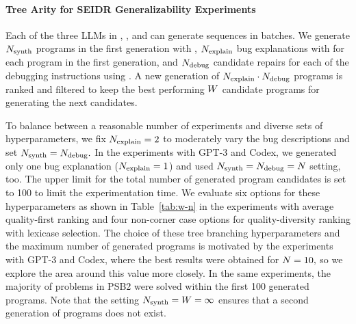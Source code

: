 
\paragraph{Tree Arity for SEIDR Generalizability Experiments}
\label{sec:seidr-tree-arity-ollama}
Each of the three LLMs in \synthesize{}, \instruct{}, and \debug{}  can generate sequences in batches. 
We generate $N_\text{synth}{}$ programs in the first generation with \synthmodel{}, $N_\text{explain}{}$ bug explanations with \textmodel{} for each program in the first generation, and $N_\text{debug}{}$ candidate repairs for each of the debugging instructions using \debugmodel{}.
A new generation of $N_\text{explain}{} \cdot N_\text{debug}{}$ programs is ranked and filtered to keep the best performing $W{}$ candidate programs for generating the next candidates. 

To balance between a reasonable number of experiments and diverse sets of hyperparameters, we fix $N_\text{explain}{}=2$ to moderately vary the bug descriptions and set $N_\text{synth}{} = N_\text{debug}{}.$
In the experiments with GPT-3 and Codex, we generated only one bug explanation ($N_\text{explain}{} = 1$) and used $N_\text{synth}{} = N_\text{debug}{} = N{}$ setting, too.
The upper limit for the total number of generated program candidates is set to 100 to limit the experimentation time. 
We evaluate six options for these hyperparameters as shown in Table~\ref{tab:w-n} in the experiments with average quality-first ranking and four non-corner case options for quality-diversity ranking with lexicase selection. 
The choice of these tree branching hyperparameters and the maximum number of generated programs is motivated by the experiments with GPT-3 and Codex, where the best results were obtained for $N{}=10,$ so we explore the area around this value more closely.
In the same experiments, the majority of problems in PSB2 were solved within the first 100 generated programs. Note that the setting $N_\text{synth}{}=W{}=\infty$ ensures that a second generation of programs does not exist.

